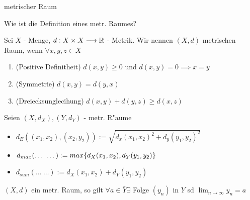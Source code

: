 \documentclass[class=article, crop=false]{standalone}
\begin{document}
\begin{zettel}{metrischer Raum}
\begin{flashcard}
\begin{question}
    Wie ist die Definition eines metr. Raumes?
\end{question}
\begin{definition}
    Sei $X$ - Menge, $d:X \times X \longrightarrow \mathbb{R}$ - Metrik. Wir nennen $(X,d)$ metrischen Raum, wenn $\forall x,y,z \in X$ 
    \begin{enumerate}
        \item (Positive Definitheit) $d(x,y) \geq 0$ und $d(x,y)= 0 \implies x = y$ 
        \item (Symmetrie) $d(x,y) = d(y,x)$ 
        \item (Dreiecksunglecihung) $d(x,y) + d(y,z) \geq d(x,z)$ 
    \end{enumerate}
\end{definition}
\end{flashcard}

\begin{example}[Metriken]
Seien $ (X,d_X) , (Y,d_Y)  $ - metr. R"aume
\begin{itemize}
    \item $d_E ( (x_1,x_2) , (x_2,y_2)) := \sqrt{d_x (x_1,x_2)^2 + d_y (y_1,y_2)^2  }$ 
    \item $d_{max} (\dots\ \dots) := max \set{ d_X (x_1,x_2) , d_Y  (y_1,y_2) }$
    \item $d_{sum} (\dots\ \dots):= d_X (x_1,x_2) +  d_Y (y_1,y_2) $
\end{itemize}
\end{example}    

\begin{theorem}
   $(X,d)$ ein metr. Raum, so gilt $\forall a \in  \bar{Y} \exists $ Folge $(y_n )$ in $Y$ sd $\lim_{n \to \infty} y_n = a$ 
\end{theorem}

\end{zettel}
\end{document}
